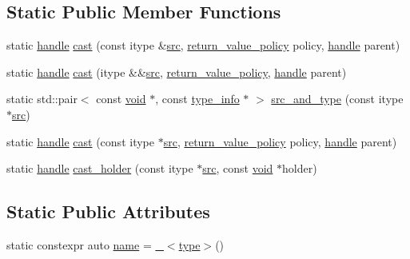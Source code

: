 \subsection*{Static Public Member Functions}
\begin{DoxyCompactItemize}
\item 
static \mbox{\hyperlink{classhandle}{handle}} \mbox{\hyperlink{classtype__caster__base_acd5bd2fafc86fb3160c7955bfc2f88de}{cast}} (const itype \&\mbox{\hyperlink{_s_d_l__opengl__glext_8h_a72e0fdf0f845ded60b1fada9e9195cd7}{src}}, \mbox{\hyperlink{detail_2common_8h_adde72ab1fb0dd4b48a5232c349a53841}{return\+\_\+value\+\_\+policy}} policy, \mbox{\hyperlink{classhandle}{handle}} parent)
\item 
static \mbox{\hyperlink{classhandle}{handle}} \mbox{\hyperlink{classtype__caster__base_abd0cc8e51c0882bb1b81710745295811}{cast}} (itype \&\&\mbox{\hyperlink{_s_d_l__opengl__glext_8h_a72e0fdf0f845ded60b1fada9e9195cd7}{src}}, \mbox{\hyperlink{detail_2common_8h_adde72ab1fb0dd4b48a5232c349a53841}{return\+\_\+value\+\_\+policy}}, \mbox{\hyperlink{classhandle}{handle}} parent)
\item 
static std\+::pair$<$ const \mbox{\hyperlink{_s_d_l__opengles2__gl2ext_8h_ae5d8fa23ad07c48bb609509eae494c95}{void}} $\ast$, const \mbox{\hyperlink{structtype__info}{type\+\_\+info}} $\ast$ $>$ \mbox{\hyperlink{classtype__caster__base_ad5559aeb9ea8d133f3a62ca22b4a1ae5}{src\+\_\+and\+\_\+type}} (const itype $\ast$\mbox{\hyperlink{_s_d_l__opengl__glext_8h_a72e0fdf0f845ded60b1fada9e9195cd7}{src}})
\item 
static \mbox{\hyperlink{classhandle}{handle}} \mbox{\hyperlink{classtype__caster__base_a0fa8012ef36eabd7993fdd3adb4fbf92}{cast}} (const itype $\ast$\mbox{\hyperlink{_s_d_l__opengl__glext_8h_a72e0fdf0f845ded60b1fada9e9195cd7}{src}}, \mbox{\hyperlink{detail_2common_8h_adde72ab1fb0dd4b48a5232c349a53841}{return\+\_\+value\+\_\+policy}} policy, \mbox{\hyperlink{classhandle}{handle}} parent)
\item 
static \mbox{\hyperlink{classhandle}{handle}} \mbox{\hyperlink{classtype__caster__base_a0754eb4fb420f51d5e38a99c9b2e725e}{cast\+\_\+holder}} (const itype $\ast$\mbox{\hyperlink{_s_d_l__opengl__glext_8h_a72e0fdf0f845ded60b1fada9e9195cd7}{src}}, const \mbox{\hyperlink{_s_d_l__opengles2__gl2ext_8h_ae5d8fa23ad07c48bb609509eae494c95}{void}} $\ast$holder)
\end{DoxyCompactItemize}
\subsection*{Static Public Attributes}
\begin{DoxyCompactItemize}
\item 
static constexpr auto \mbox{\hyperlink{classtype__caster__base_a1287a0b427306b31949df84e062373ba}{name}} = \mbox{\hyperlink{descr_8h_af114703e20c6527e87163eb2798f74b8}{\+\_\+}}$<$\mbox{\hyperlink{_s_d_l__opengl_8h_ad5ddf6fca7b585646515660e810e0188}{type}}$>$()
\end{DoxyCompactItemize}
